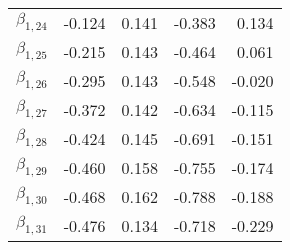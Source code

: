 \begin{tabular}{lrrrr}
$\beta_{1,24}$ & -0.124 &     0.141 &   -0.383 &     0.134 \\
$\beta_{1,25}$ & -0.215 &     0.143 &   -0.464 &     0.061 \\
$\beta_{1,26}$ & -0.295 &     0.143 &   -0.548 &    -0.020 \\
$\beta_{1,27}$ & -0.372 &     0.142 &   -0.634 &    -0.115 \\
$\beta_{1,28}$ & -0.424 &     0.145 &   -0.691 &    -0.151 \\
$\beta_{1,29}$ & -0.460 &     0.158 &   -0.755 &    -0.174 \\
$\beta_{1,30}$ & -0.468 &     0.162 &   -0.788 &    -0.188 \\
$\beta_{1,31}$ & -0.476 &     0.134 &   -0.718 &    -0.229 \\
\bottomrule
\end{tabular}
